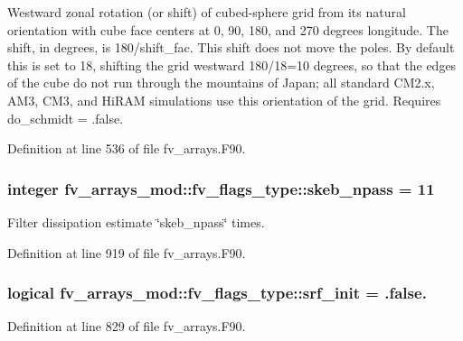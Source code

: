 Westward zonal rotation (or shift) of cubed-\/sphere grid from its natural orientation with cube face centers at 0, 90, 180, and 270 degrees longitude. The shift, in degrees, is 180/shift\-\_\-fac. This shift does not move the poles. By default this is set to 18, shifting the grid westward 180/18=10 degrees, so that the edges of the cube do not run through the mountains of Japan; all standard C\-M2.\-x, A\-M3, C\-M3, and Hi\-R\-A\-M simulations use this orientation of the grid. Requires do\-\_\-schmidt = .false. 



Definition at line 536 of file fv\-\_\-arrays.\-F90.

\subsubsection[{skeb\-\_\-npass}]{\setlength{\rightskip}{0pt plus 5cm}integer fv\-\_\-arrays\-\_\-mod\-::fv\-\_\-flags\-\_\-type\-::skeb\-\_\-npass = 11}\label{structfv__arrays__mod_1_1fv__flags__type_a7ccd8f4ddaf20ca9442d71fcc09848cb}


Filter dissipation estimate \char`\"{}skeb\-\_\-npass\char`\"{} times. 



Definition at line 919 of file fv\-\_\-arrays.\-F90.

\subsubsection[{srf\-\_\-init}]{\setlength{\rightskip}{0pt plus 5cm}logical fv\-\_\-arrays\-\_\-mod\-::fv\-\_\-flags\-\_\-type\-::srf\-\_\-init = .false.}\label{structfv__arrays__mod_1_1fv__flags__type_a89f77eb07284c379078aa4dd37ec57fe}


Definition at line 829 of file fv\-\_\-arrays.\-F90.

